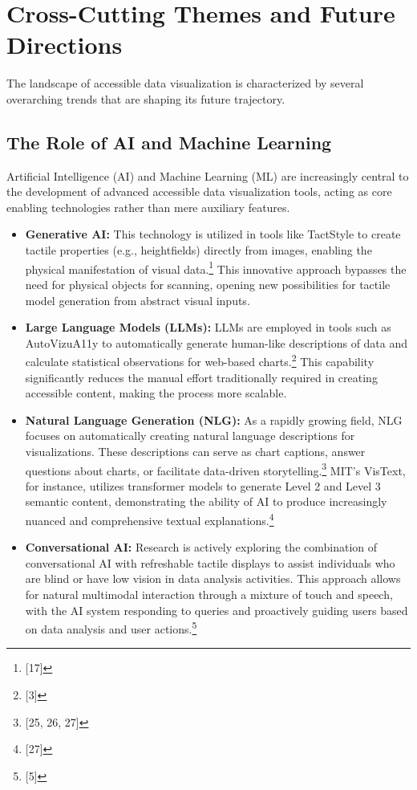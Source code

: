 \section{Cross-Cutting Themes and Future Directions}
The landscape of accessible data visualization is characterized by several overarching trends that are shaping its future trajectory.

\subsection{The Role of AI and Machine Learning}
Artificial Intelligence (AI) and Machine Learning (ML) are increasingly central to the development of advanced accessible data visualization tools, acting as core enabling technologies rather than mere auxiliary features.

\begin{itemize}
    \item \textbf{Generative AI:} This technology is utilized in tools like TactStyle to create tactile properties (e.g., heightfields) directly from images, enabling the physical manifestation of visual data.\footnote{[17]} This innovative approach bypasses the need for physical objects for scanning, opening new possibilities for tactile model generation from abstract visual inputs.
    \item \textbf{Large Language Models (LLMs):} LLMs are employed in tools such as AutoVizuA11y to automatically generate human-like descriptions of data and calculate statistical observations for web-based charts.\footnote{[3]} This capability significantly reduces the manual effort traditionally required in creating accessible content, making the process more scalable.
    \item \textbf{Natural Language Generation (NLG):} As a rapidly growing field, NLG focuses on automatically creating natural language descriptions for visualizations. These descriptions can serve as chart captions, answer questions about charts, or facilitate data-driven storytelling.\footnote{[25, 26, 27]} MIT's VisText, for instance, utilizes transformer models to generate Level 2 and Level 3 semantic content, demonstrating the ability of AI to produce increasingly nuanced and comprehensive textual explanations.\footnote{[27]}
    \item \textbf{Conversational AI:} Research is actively exploring the combination of conversational AI with refreshable tactile displays to assist individuals who are blind or have low vision in data analysis activities. This approach allows for natural multimodal interaction through a mixture of touch and speech, with the AI system responding to queries and proactively guiding users based on data analysis and user actions.\footnote{[5]}
\end{itemize}

